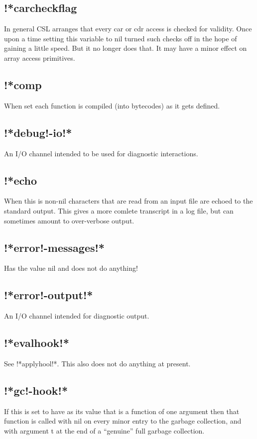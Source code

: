 \documentclass[a4paper,11pt]{article}
\begin{document}
\subsection{\ttfamily !*carcheckflag}
In general CSL arranges that every {\ttfamily car} or {\ttfamily cdr} access
is checked for validity. Once upon a time setting this variable to nil
turned such checks off in the hope of gaining a little speed. But it no
longer does that. It may have a minor effect on array access primitives.
\subsection{\ttfamily !*comp}
When set each function is compiled (into bytecodes) as it gets defined.
\subsection{\ttfamily !*debug!-io!*}
An I/O channel intended to be used for diagnostic interactions.
\subsection{\ttfamily !*echo}
When this is non-nil characters that are read from an input file are
echoed to the standard output. This gives a more comlete transcript in
a log file, but can sometimes amount to over-verbose output.
\subsection{\ttfamily !*error!-messages!*}
Has the value nil and does not do anything!
\subsection{\ttfamily !*error!-output!*}
An I/O channel intended for diagnostic output.
\subsection{\ttfamily !*evalhook!*}
See {\ttfamily !*applyhool!*}. This also does not do anything at present.
\subsection{\ttfamily !*gc!-hook!*}
If this is set to have as its value that is a function of one argument then
that function is called with {\ttfamily nil} on every minor entry to the
garbage collection, and with argument {\ttfamily t} at the end of a ``genuine''
full garbage collection.
\end{document}
